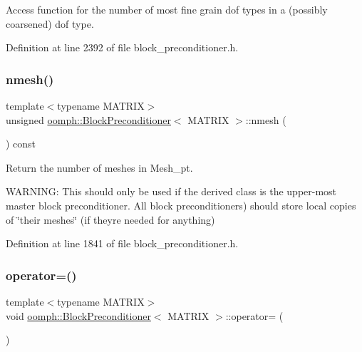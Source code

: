 Access function for the number of most fine grain dof types in a (possibly coarsened) dof type. 



Definition at line 2392 of file block\+\_\+preconditioner.\+h.

\mbox{\label{classoomph_1_1BlockPreconditioner_a193776a271f7c23d20d2102de0ff1cb9}} 
\subsubsection{\texorpdfstring{nmesh()}{nmesh()}}
{\footnotesize\ttfamily template$<$typename M\+A\+T\+R\+IX$>$ \\
unsigned \hyperlink{classoomph_1_1BlockPreconditioner}{oomph\+::\+Block\+Preconditioner}$<$ M\+A\+T\+R\+IX $>$\+::nmesh (\begin{DoxyParamCaption}{ }\end{DoxyParamCaption}) const\hspace{0.3cm}{\ttfamily [inline]}}



Return the number of meshes in Mesh\+\_\+pt. 

W\+A\+R\+N\+I\+NG\+: This should only be used if the derived class is the upper-\/most master block preconditioner. All block preconditioners) should store local copies of \char`\"{}their meshes\char`\"{} (if they\textquotesingle{}re needed for anything) 

Definition at line 1841 of file block\+\_\+preconditioner.\+h.

\mbox{\label{classoomph_1_1BlockPreconditioner_a910f9395fa4f5f9bc4d13a9d104c432d}} 
\subsubsection{\texorpdfstring{operator=()}{operator=()}}
{\footnotesize\ttfamily template$<$typename M\+A\+T\+R\+IX$>$ \\
void \hyperlink{classoomph_1_1BlockPreconditioner}{oomph\+::\+Block\+Preconditioner}$<$ M\+A\+T\+R\+IX $>$\+::operator= (\begin{DoxyParamCaption}\item[{const \hyperlink{classoomph_1_1BlockPreconditioner}{Block\+Preconditioner}$<$ M\+A\+T\+R\+IX $>$ \&}]{ }\end{DoxyParamCaption})\hspace{0.3cm}{\ttfamily [inline]}}



